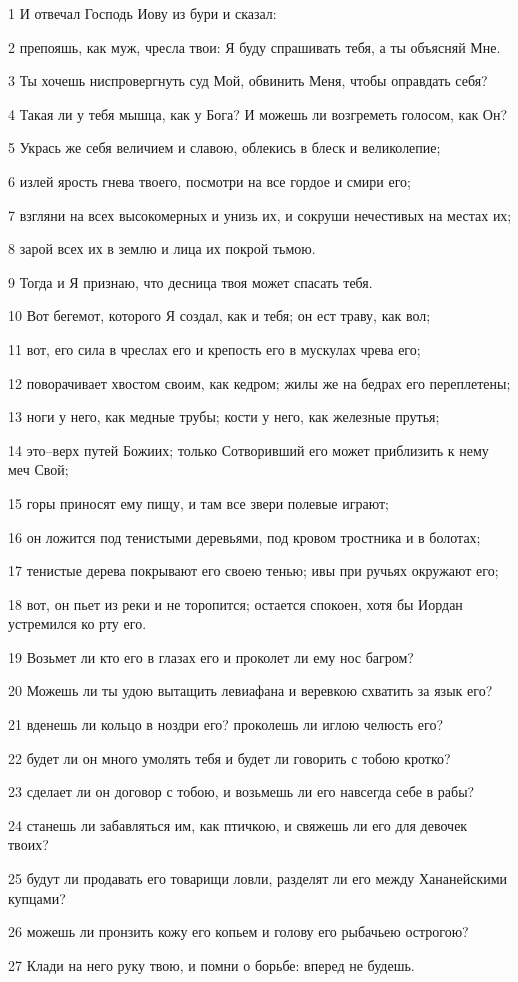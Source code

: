 \par 1 И отвечал Господь Иову из бури и сказал:
\par 2 препояшь, как муж, чресла твои: Я буду спрашивать тебя, а ты объясняй Мне.
\par 3 Ты хочешь ниспровергнуть суд Мой, обвинить Меня, чтобы оправдать себя?
\par 4 Такая ли у тебя мышца, как у Бога? И можешь ли возгреметь голосом, как Он?
\par 5 Укрась же себя величием и славою, облекись в блеск и великолепие;
\par 6 излей ярость гнева твоего, посмотри на все гордое и смири его;
\par 7 взгляни на всех высокомерных и унизь их, и сокруши нечестивых на местах их;
\par 8 зарой всех их в землю и лица их покрой тьмою.
\par 9 Тогда и Я признаю, что десница твоя может спасать тебя.
\par 10 Вот бегемот, которого Я создал, как и тебя; он ест траву, как вол;
\par 11 вот, его сила в чреслах его и крепость его в мускулах чрева его;
\par 12 поворачивает хвостом своим, как кедром; жилы же на бедрах его переплетены;
\par 13 ноги у него, как медные трубы; кости у него, как железные прутья;
\par 14 это--верх путей Божиих; только Сотворивший его может приблизить к нему меч Свой;
\par 15 горы приносят ему пищу, и там все звери полевые играют;
\par 16 он ложится под тенистыми деревьями, под кровом тростника и в болотах;
\par 17 тенистые дерева покрывают его своею тенью; ивы при ручьях окружают его;
\par 18 вот, он пьет из реки и не торопится; остается спокоен, хотя бы Иордан устремился ко рту его.
\par 19 Возьмет ли кто его в глазах его и проколет ли ему нос багром?
\par 20 Можешь ли ты удою вытащить левиафана и веревкою схватить за язык его?
\par 21 вденешь ли кольцо в ноздри его? проколешь ли иглою челюсть его?
\par 22 будет ли он много умолять тебя и будет ли говорить с тобою кротко?
\par 23 сделает ли он договор с тобою, и возьмешь ли его навсегда себе в рабы?
\par 24 станешь ли забавляться им, как птичкою, и свяжешь ли его для девочек твоих?
\par 25 будут ли продавать его товарищи ловли, разделят ли его между Хананейскими купцами?
\par 26 можешь ли пронзить кожу его копьем и голову его рыбачьею острогою?
\par 27 Клади на него руку твою, и помни о борьбе: вперед не будешь.

